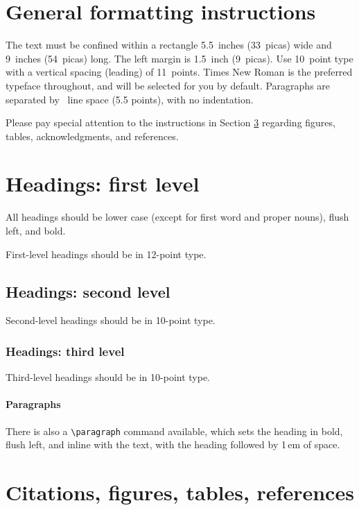 \documentclass{article}
\begin{document}
\section{General formatting instructions}
\label{gen_inst}

The text must be confined within a rectangle 5.5~inches (33~picas) wide and
9~inches (54~picas) long. The left margin is 1.5~inch (9~picas).  Use 10~point
type with a vertical spacing (leading) of 11~points.  Times New Roman is the
preferred typeface throughout, and will be selected for you by default.
Paragraphs are separated by ~line space (5.5 points), with no
indentation.


Please pay special attention to the instructions in Section \ref{others}
regarding figures, tables, acknowledgments, and references.

\section{Headings: first level}
\label{headings}

All headings should be lower case (except for first word and proper nouns),
flush left, and bold.

First-level headings should be in 12-point type.

\subsection{Headings: second level}

Second-level headings should be in 10-point type.

\subsubsection{Headings: third level}

Third-level headings should be in 10-point type.

\paragraph{Paragraphs}

There is also a \verb+\paragraph+ command available, which sets the heading in
bold, flush left, and inline with the text, with the heading followed by 1\,em
of space.

\section{Citations, figures, tables, references}
\label{others}
\end{document}

